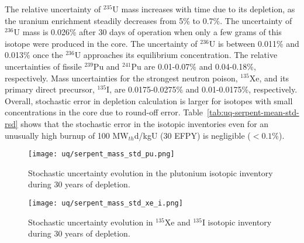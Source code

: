 The relative uncertainty of $^{235}$U mass increases with time due to its 
depletion, as the uranium enrichment steadily decreases from 5\% to 0.7\%.
The uncertainty of $^{236}$U mass is 
0.026\% after 30 days of operation when only a few grams of this isotope were 
produced in the core. The uncertainty of $^{236}$U is between 0.011\% and 
0.013\% once the $^{236}$U approaches its equilibrium concentration. The 
relative uncertainties of fissile $^{239}$Pu and $^{241}$Pu are 0.01-0.07\% 
and 0.04-0.18\%, respectively. Mass uncertainties for the 
strongest neutron poison, $^{135}$Xe, and its primary direct precursor, 
$^{135}$I, are 0.0175-0.0275\% and 0.01-0.0175\%, respectively. Overall, 
stochastic error in depletion calculation is larger for isotopes with small 
concentrations in the core due to round-off error. 
Table~\ref{tab:uq-serpent-mean-std-rsd} shows that the stochastic error in the 
isotopic inventories even for an unusually high burnup of 100 MW$_{th}$d/kgU 
(30 EFPY) is negligible ($<0.1$\%).

\begin{figure}[htp!] %
	\centering
	\texttt{[image: uq/serpent\_mass\_std\_pu.png]}
	\vspace{-3mm}
	\caption{Stochastic uncertainty evolution in the plutonium isotopic 
		inventory during 30 years of depletion.}
	\label{fig:uq-serpent-pu}
\end{figure}
	\vspace{-9mm}
\begin{figure}[hbp!] %
	\centering
	\texttt{[image: uq/serpent\_mass\_std\_xe\_i.png]}
		\vspace{-3mm}
	\caption{Stochastic uncertainty evolution in $^{135}$Xe and $^{135}$I 
	isotopic inventory during 30 years of depletion.}
	\label{fig:uq-serpent-xe-i}
\end{figure}


